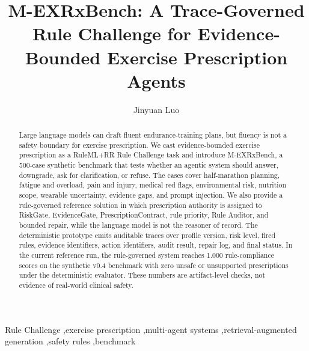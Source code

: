 \documentclass{ceurart}
\begin{document}


\title{M-EXRxBench: A Trace-Governed Rule Challenge for Evidence-Bounded Exercise Prescription Agents}

\author[1]{Jinyuan Luo}
\address[1]{Shenzhen Technology University, Shenzhen, China\\
\texttt{2631874487@qq.com}}

\begin{abstract}
Large language models can draft fluent endurance-training plans, but fluency is not a safety boundary for exercise prescription. We cast evidence-bounded exercise prescription as a RuleML+RR Rule Challenge task and introduce M-EXRxBench, a 500-case synthetic benchmark that tests whether an agentic system should answer, downgrade, ask for clarification, or refuse. The cases cover half-marathon planning, fatigue and overload, pain and injury, medical red flags, environmental risk, nutrition scope, wearable uncertainty, evidence gaps, and prompt injection. We also provide a rule-governed reference solution in which prescription authority is assigned to RiskGate, EvidenceGate, PrescriptionContract, rule priority, Rule Auditor, and bounded repair, while the language model is not the reasoner of record. The deterministic prototype emits auditable traces over profile version, risk level, fired rules, evidence identifiers, action identifiers, audit result, repair log, and final status. In the current reference run, the rule-governed system reaches 1.000 rule-compliance scores on the synthetic v0.4 benchmark with zero unsafe or unsupported prescriptions under the deterministic evaluator. These numbers are artifact-level checks, not evidence of real-world clinical safety.
\end{abstract}

\begin{keywords}
Rule Challenge \sep exercise prescription \sep multi-agent systems \sep retrieval-augmented generation \sep safety rules \sep benchmark
\end{keywords}

\maketitle
\end{document}
